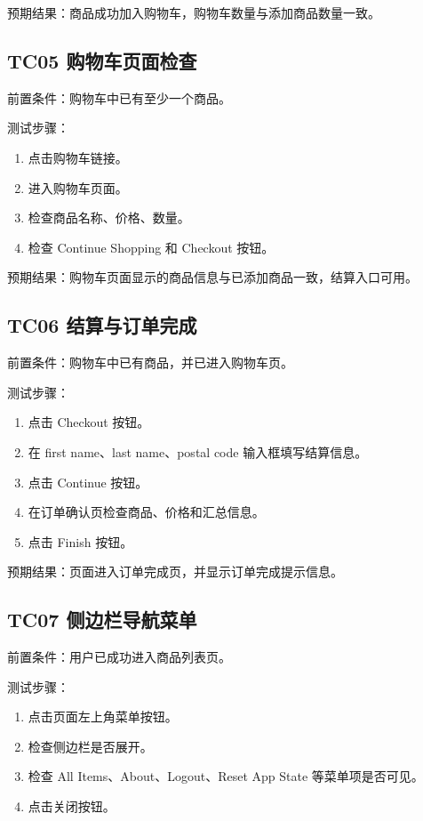 \documentclass[UTF8,a4paper,12pt]{ctexart}
\begin{document}
预期结果：商品成功加入购物车，购物车数量与添加商品数量一致。

\subsection{TC05 购物车页面检查}

前置条件：购物车中已有至少一个商品。

测试步骤：

\begin{enumerate}
  \item 点击购物车链接。
  \item 进入购物车页面。
  \item 检查商品名称、价格、数量。
  \item 检查 Continue Shopping 和 Checkout 按钮。
\end{enumerate}

预期结果：购物车页面显示的商品信息与已添加商品一致，结算入口可用。

\subsection{TC06 结算与订单完成}

前置条件：购物车中已有商品，并已进入购物车页。

测试步骤：

\begin{enumerate}
  \item 点击 Checkout 按钮。
  \item 在 first name、last name、postal code 输入框填写结算信息。
  \item 点击 Continue 按钮。
  \item 在订单确认页检查商品、价格和汇总信息。
  \item 点击 Finish 按钮。
\end{enumerate}

预期结果：页面进入订单完成页，并显示订单完成提示信息。

\subsection{TC07 侧边栏导航菜单}

前置条件：用户已成功进入商品列表页。

测试步骤：

\begin{enumerate}
  \item 点击页面左上角菜单按钮。
  \item 检查侧边栏是否展开。
  \item 检查 All Items、About、Logout、Reset App State 等菜单项是否可见。
  \item 点击关闭按钮。
\end{enumerate}
\end{document}
